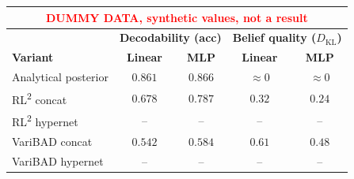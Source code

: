 \begin{tabular}{lcccc}
\hline
\multicolumn{5}{c}{\textcolor{red}{\footnotesize DUMMY DATA, synthetic values, not a result}} \\
\hline
 & \multicolumn{2}{c}{\textbf{Decodability (acc)}}
   & \multicolumn{2}{c}{\textbf{Belief quality ($D_{\mathrm{KL}}$)}} \\
\textbf{Variant} & \textbf{Linear} & \textbf{MLP} & \textbf{Linear} & \textbf{MLP} \\
\hline
Analytical posterior & $0.861$ & $0.866$ & $\approx 0$ & $\approx 0$ \\
\hline
RL\textsuperscript{2} concat & $0.678$ & $0.787$ & $0.32$ & $0.24$ \\
RL\textsuperscript{2} hypernet & -- & -- & -- & -- \\
VariBAD concat & $0.542$ & $0.584$ & $0.61$ & $0.48$ \\
VariBAD hypernet & -- & -- & -- & -- \\
\hline
\end{tabular}
